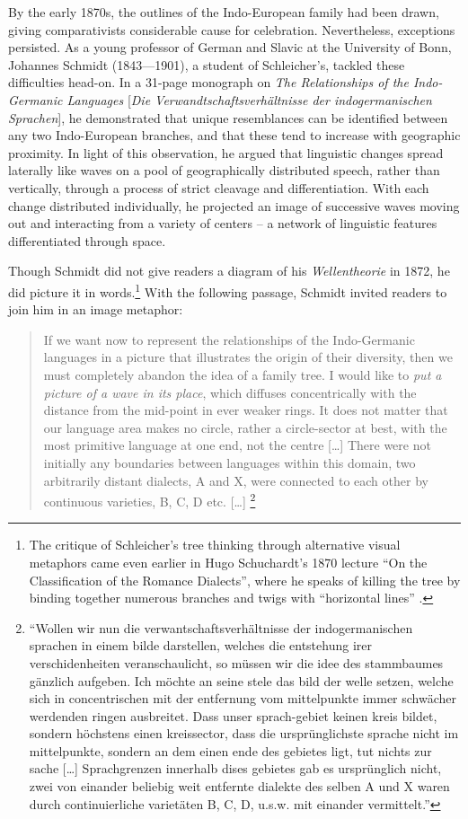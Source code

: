\documentclass[output=paper]{langscibook}
\begin{document}
By the early 1870s, the outlines of the Indo-European family had been drawn, giving comparativists considerable cause for celebration. Nevertheless, exceptions persisted. As a young professor of German and Slavic at the University of Bonn, Johannes Schmidt (1843—1901), a student of Schleicher's, tackled these difficulties head-on. In a 31-page monograph on \emph{The Relationships of the Indo-Germanic Languages} [\emph{Die Verwandtschaftsverhältnisse der indo\-ger\-manischen Spra\-chen}], he demonstrated that unique resemblances can be identified between any two Indo-European branches, and that these tend to increase with geographic proximity. In light of this observation, he argued that linguistic changes spread laterally like waves on a pool of geographically distributed speech, rather than vertically, through a process of strict cleavage and differentiation. With each change distributed individually, he projected an image of successive waves moving out and interacting from a variety of centers – a network of linguistic features differentiated through space.

Though Schmidt did not give readers a diagram of his \emph{Wellentheorie} in 1872, he did picture it in words.\footnote{The critique of Schleicher's tree thinking through alternative visual metaphors came even earlier in Hugo Schuchardt's 1870 lecture ``On the Classification of the Romance Dialects'', where he speaks of killing the tree by binding together numerous branches and twigs with ``horizontal lines'' \citep[11]{Schuchardt19001870}.} With the following passage, Schmidt invited readers to join him in an image metaphor:

\begin{quotation}
If we want now to represent the relationships of the Indo-Germanic languages in a picture that illustrates the origin of their diversity, then we must completely abandon the idea of a family tree. I would like to \emph{put a picture of a wave in its place}, which diffuses concentrically with the distance from the mid-point in ever weaker rings. It does not matter that our language area makes no circle, rather a circle-sector at best, with the most primitive language at	one end, not the centre […] There were not initially any boundaries between languages within this domain, two arbitrarily distant dialects, A and X, were connected to each other by continuous varieties, B, C, D etc. […] \citep[27-28]{Schmidt1872}\footnote{``Wollen wir nun die verwantschaftsverhältnisse der indogermanischen sprachen in einem bilde darstellen, welches die entstehung irer verschidenheiten veranschaulicht, so müssen wir die idee des stammbaumes gänzlich aufgeben. Ich möchte an seine stele das bild der welle setzen, welche sich in concentrischen mit der entfernung vom mittelpunkte immer schwächer werdenden ringen ausbreitet. Dass unser sprach-gebiet keinen kreis bildet, sondern höchstens einen kreissector, dass die ursprünglichste sprache nicht im mittelpunkte, sondern an dem einen ende des gebietes ligt, tut nichts zur sache […] Sprachgrenzen innerhalb dises gebietes gab es ursprünglich nicht, zwei von einander beliebig weit entfernte dialekte des selben A und X waren durch continuierliche varietäten B, C, D, u.s.w. mit einander vermittelt.''} 
\end{quotation}
\end{document}
